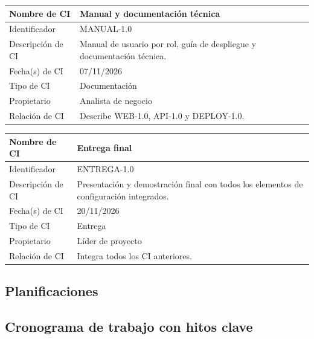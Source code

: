 \documentclass[letterpaper,11pt]{article}
\begin{document}
\noindent\begin{minipage}{\textwidth}
\small\renewcommand{\arraystretch}{1.9}
\begin{tabularx}{\textwidth}{|p{3.3cm}|Y|}
\hline
Nombre de CI & Manual y documentación técnica \\ \hline
Identificador & MANUAL-1.0 \\ \hline
Descripción de CI & Manual de usuario por rol, guía de despliegue y documentación técnica. \\ \hline
Fecha(s) de CI & 07/11/2026 \\ \hline
Tipo de CI & Documentación \\ \hline
Propietario & Analista de negocio \\ \hline
Relación de CI & Describe WEB-1.0, API-1.0 y DEPLOY-1.0. \\ \hline
\end{tabularx}
\end{minipage}\par\bigskip
\noindent\begin{minipage}{\textwidth}
\small\renewcommand{\arraystretch}{1.9}
\begin{tabularx}{\textwidth}{|p{3.3cm}|Y|}
\hline
Nombre de CI & Entrega final \\ \hline
Identificador & ENTREGA-1.0 \\ \hline
Descripción de CI & Presentación y demostración final con todos los elementos de configuración integrados. \\ \hline
Fecha(s) de CI & 20/11/2026 \\ \hline
Tipo de CI & Entrega \\ \hline
Propietario & Líder de proyecto \\ \hline
Relación de CI & Integra todos los CI anteriores. \\ \hline
\end{tabularx}
\end{minipage}\par\bigskip


\subsection{Planificaciones}

\subsection{Cronograma de trabajo con hitos clave}
\end{document}
